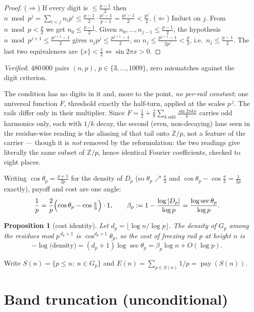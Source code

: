 \documentclass[11pt]{article}
\newtheorem{proposition}[theorem]{Proposition}
\begin{document}
\begin{proof}
($\Rightarrow$) If every digit is $\le\frac{p-1}2$ then
$n\bmod p^{j}=\sum_{i<j}n_ip^i\le\frac{p-1}2\cdot\frac{p^j-1}{p-1}
=\frac{p^j-1}2<\frac{p^j}2$.
($\Leftarrow$) Induct on $j$.  From $n\bmod p<\frac p2$ we get
$n_0\le\frac{p-1}2$.  Given $n_0,\dots,n_{j-1}\le\frac{p-1}2$, the hypothesis
$n\bmod p^{j+1}\le\frac{p^{j+1}-1}2$ gives
$n_jp^j\le\frac{p^{j+1}-1}2$, so $n_j\le\frac{p^{j+1}-1}{2p^j}<\frac p2$, i.e.\
$n_j\le\frac{p-1}2$.  The last two equivalences are
$\{x\}<\frac12\iff\sin2\pi x>0$.
\end{proof}

\emph{Verified}: $480\,000$ pairs $(n,p)$, $p\in\{3,\dots,1009\}$, zero
mismatches against the digit criterion.

The condition has no digits in it and, more to the point, \emph{no per-rail
constant}: one universal function $F$, threshold exactly the half-turn, applied
at the scales $p^{\,j}$.  The rails differ only in their multiplier.  Since
$F=\frac12+\frac2\pi\sum_{k\ \mathrm{odd}}\frac{\sin2\pi kx}{k}$ carries odd
harmonics only, each with $1/k$ decay, the second (even, non-decaying) lane
seen in the residue-wise reading is the aliasing of that tail onto
$\mathbb Z/p$, not a feature of the carrier --- though it is \emph{not} removed
by the reformulation: the two readings give literally the same subset of
$\mathbb Z/p$, hence identical Fourier coefficients, checked to eight places.

Writing $\cos\theta_p=\frac{p+1}{2p}$ for the density of $D_p$
(so $\theta_p\nearrow\frac\pi3$ and $\cos\theta_p-\cos\frac\pi3=\frac1{2p}$
exactly), payoff and cost are one angle:
\[
  \frac1p=\frac{2}{p}\Bigl(\cos\theta_p-\cos\tfrac\pi3\Bigr)\cdot 1,
  \qquad
  \beta_p:=1-\frac{\log|D_p|}{\log p}=\frac{\log\sec\theta_p}{\log p}.
\]

\begin{proposition}[cost identity]\label{prop:cost}
Let $d_p=\lfloor\log n/\log p\rfloor$.  The density of $G_p$ among the residues
mod $p^{\,d_p+1}$ is $\cos^{d_p+1}\theta_p$, so the cost of freezing rail $p$ at
height $n$ is
\[
  -\log\bigl(\text{density}\bigr)=(d_p+1)\log\sec\theta_p=\beta_p\log n+O(\log p).
\]
\end{proposition}

Write $S(n)=\{p\le n:\ n\in G_p\}$ and
$E(n)=\sum_{p\in S(n)}1/p=\operatorname{pay}(S(n))$.

\section{Band truncation (unconditional)}
\end{document}
